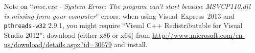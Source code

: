 Note on ``\emph{moc.exe - System Error: The program can't start
  because MSVCP110.dll is missing from your computer}'' errors: when using Visual~Express~2013 and \texttt{pthreads-w32} 2.9.1, you might require ``Visual C++ Redistributable for Visual Studio 2012'': download (either x86 or x64) from \url{http://www.microsoft.com/en-us/download/details.aspx?id=30679} and install.

